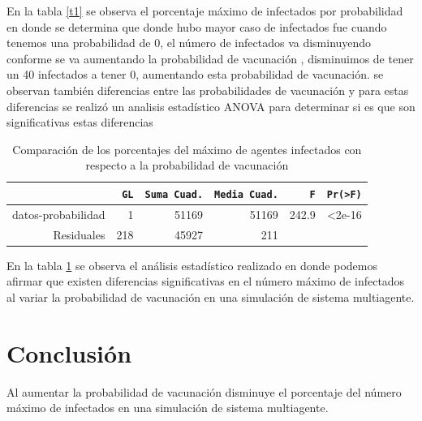 \documentclass{article}
\begin{document}
 En la tabla \ref{t1} se observa el porcentaje m\'aximo de infectados por probabilidad en donde se determina que donde hubo mayor caso de infectados fue cuando tenemos una probabilidad de 0, el n\'umero de infectados va disminuyendo conforme se va aumentando la probabilidad de vacunaci\'on , disminuimos de tener un 40 infectados a tener 0, aumentando esta probabilidad de vacunaci\'on.
se observan tambi\'en diferencias entre las probabilidades de vacunaci\'on y para  estas diferencias se realiz\'o un analisis estad\'istico ANOVA \citep{clara} para determinar si es que son significativas estas diferencias

\begin{table}[H]
 \caption{Comparaci\'on de los porcentajes del m\'aximo de agentes infectados con respecto a la probabilidad de vacunaci\'on}
 \label{t1}
 \begin{center}
 \begin{tabular}{r|r|r|r|r|r}
\texttt{} & \texttt{GL} & \texttt{Suma Cuad.} &\texttt{Media Cuad.} & \texttt{F}  & \texttt{Pr(>F)} \\
\hline
datos-probabilidad & 1 & 51169 & 51169 & 242.9 & <2e-16\\ 
\hline
Residuales & 218& 45927 & 211 \\ 
\end{tabular}
\end{center}
\label{t2}
\end{table}

En la tabla \ref{t2} se observa el an\'alisis estad\'istico realizado en donde podemos afirmar que existen diferencias significativas en el n\'umero m\'aximo de infectados al variar la probabilidad de vacunaci\'on en una simulaci\'on de sistema multiagente.


\section{Conclusi\'{o}n}\label{con}
Al aumentar  la probabilidad de vacunaci\'on disminuye el porcentaje del n\'umero m\'aximo de infectados en una simulaci\'on de sistema multiagente.

  
  
\end{document}

